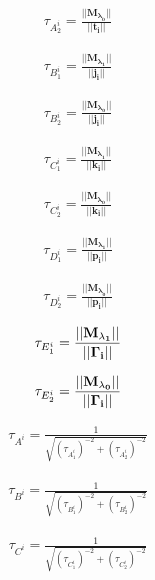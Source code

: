 \documentclass[tese_patricia]{subfiles}
\begin{document}
\begin{align}
	\tau_{A_2^{i}} = \frac{|| \mathbf{M_{\lambda_0}} || }{||\mathbf{t_{i}} ||} 
\end{align}

\begin{align}
	\tau_{B_1^{i}} = \frac{|| \mathbf{M_{\lambda_1}} || }{||\mathbf{j_{i}} ||} 
\end{align}

\begin{align}
	\tau_{B_2^{i}} = \frac{|| \mathbf{M_{\lambda_0}} || }{||\mathbf{j_{i}} ||} 
\end{align}

\begin{align}
	\tau_{C_1^{i}} = \frac{|| \mathbf{M_{\lambda_1}} || }{||\mathbf{k_{i}} ||} 
\end{align}

\begin{align}
	\tau_{C_2^{i}} = \frac{|| \mathbf{M_{\lambda_0}} || }{||\mathbf{k_{i}} ||} 
\end{align}

\begin{align}
	\tau_{D_1^{i}} = \frac{|| \mathbf{M_{\lambda_1}} || }{||\mathbf{p_{i}} ||} 
\end{align}

\begin{align}
	\tau_{D_2^{i}} = \frac{|| \mathbf{M_{\lambda_0}} || }{||\mathbf{p_{i}} ||} 
\end{align}

\begin{align}
	\tau_{E_1^{i}} = \frac{|| \mathbf{M_{\lambda_1}} || }{||\mathbf{\Gamma_{i}} ||} 
\end{align}

\begin{align}
	\tau_{E_2^{i}} = \frac{|| \mathbf{M_{\lambda_0}} || }{||\mathbf{\Gamma_{i}} ||} 
\end{align}


\begin{align}
	\tau_{A^{i}} = \frac{1}{\sqrt{ \left(\tau_{A_1^{i}}\right)^{-2} + \left(\tau_{A_2^{i}}\right)^{-2} } }
\end{align}

\begin{align}
	\tau_{B^{i}} = \frac{1}{\sqrt{ \left(\tau_{B_1^{i}}\right)^{-2} + \left(\tau_{B_2^{i}}\right)^{-2} } }
\end{align}

\begin{align}
	\tau_{C^{i}} = \frac{1}{\sqrt{ \left(\tau_{C_1^{i}}\right)^{-2} + \left(\tau_{C_2^{i}}\right)^{-2} } }
\end{align}
\end{document}
